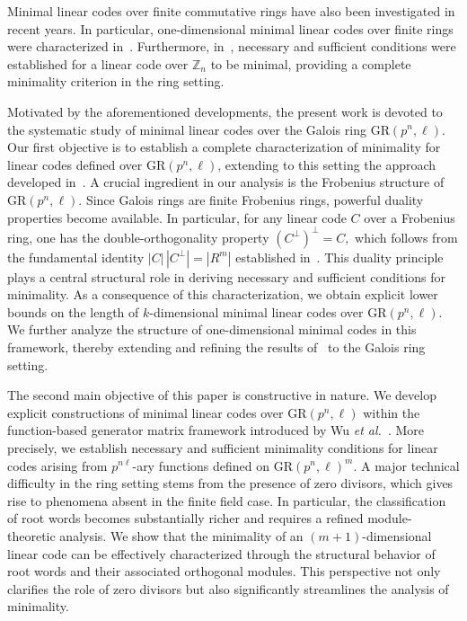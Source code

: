 \documentclass[10pt]{article}
\theoremstyle{definition}
\begin{document}
Minimal linear codes over finite commutative rings have also been
investigated in recent years. In particular, one-dimensional
minimal linear codes over finite rings were characterized
in~\cite{MajiMesnager}. Furthermore, in~\cite{ChatterjeeMesnager}, necessary
and sufficient conditions were established for a linear code over
$\mathbb{Z}_n$ to be minimal, providing a complete minimality
criterion in the ring setting.

Motivated by the aforementioned developments, the present work is devoted to the systematic study of minimal linear codes over the Galois ring $\mathrm{GR}(p^{n},\ell)$. Our first objective is to establish a complete characterization of minimality for linear codes defined over $\mathrm{GR}(p^{n},\ell)$, extending to this setting the approach developed in~\cite{ChatterjeeMesnager}.
A crucial ingredient in our analysis is the Frobenius structure of $\mathrm{GR}(p^{n},\ell)$. Since Galois rings are finite Frobenius rings, powerful duality properties become available. In particular, for any linear code $C$ over a Frobenius ring, one has the double-orthogonality property $(C^{\perp})^{\perp} = C,$ which follows from the fundamental identity $|C|\,|C^{\perp}| = |R^{m}|$ established in~\cite{Wood}. This duality principle plays a central structural role in deriving necessary and sufficient conditions for minimality.  As a consequence of this characterization, we obtain explicit lower bounds on the length of $k$-dimensional minimal linear codes over $\mathrm{GR}(p^{n},\ell)$. We further analyze the structure of one-dimensional minimal codes in this framework, thereby extending and refining the results of~\cite{ChatterjeeMesnager} to the Galois ring setting.

The second main objective of this paper is constructive in nature. We develop explicit constructions of minimal linear codes over $\mathrm{GR}(p^{n},\ell)$ within the function-based generator matrix framework introduced by Wu \emph{et al.}~\cite{WuLuCao}. More precisely, we establish necessary and sufficient minimality conditions for linear codes arising from $p^{n\ell}$-ary functions defined on $\mathrm{GR}(p^{n},\ell)^{m}$. A major technical difficulty in the ring setting stems from the presence of zero divisors, which gives rise to phenomena absent in the finite field case. In particular, the classification of root words becomes substantially richer and requires a refined module-theoretic analysis. We show that the minimality of an $(m+1)$-dimensional linear code can be effectively characterized through the structural behavior of root words and their associated orthogonal modules. This perspective not only clarifies the role of zero divisors but also significantly streamlines the analysis of minimality.
\end{document}
